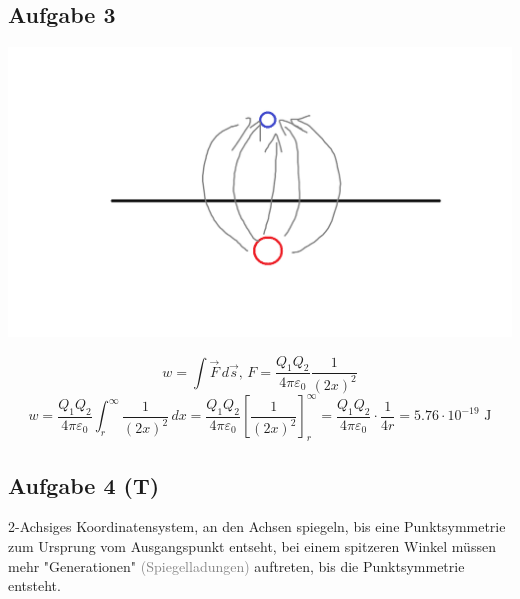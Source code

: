 \documentclass{article}
\begin{document}
\subsection*{Aufgabe 3}
\begin{center}
    \includegraphics{Abbildungen/Abb.2.png}
\end{center}
\begin{equation*}
    w = \int \vec{F}\,d\vec{s}, \,F=\frac{Q_1Q_2}{4\pi\varepsilon_0}\frac{1}{(2x)^2}
\end{equation*}
\begin{equation*}
    w = \frac{Q_1Q_2}{4\pi\varepsilon_0} \int_{r}^{\infty} \frac{1}{(2x)^2}\,dx = \frac{Q_1Q_2}{4\pi\varepsilon_0} \left[\frac{1}{(2x)^2}\right]^\infty_r = \frac{Q_1Q_2}{4\pi\varepsilon_0} \cdot \frac{1}{4r} = 5.76 \cdot 10^{-19} \text{ J}
\end{equation*}

\subsection*{Aufgabe 4 (T)}
2-Achsiges Koordinatensystem, an den Achsen spiegeln, bis eine Punktsymmetrie zum Ursprung vom Ausgangspunkt entseht, bei einem spitzeren Winkel müssen mehr "Generationen" \textcolor{gray}{(Spiegelladungen)} auftreten, bis die Punktsymmetrie entsteht.

\newpage
\end{document}
